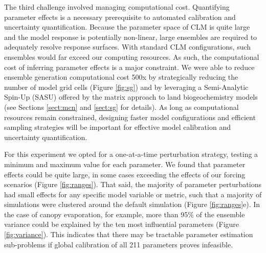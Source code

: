 \documentclass[draft]{agujournal2019}
\begin{document}
The third challenge involved managing computational cost. Quantifying parameter effects is a necessary prerequisite to automated calibration and uncertainty quantification. Because the parameter space of CLM is quite large and the model response is potentially non-linear, large ensembles are required to adequately resolve response surfaces. With standard CLM configurations, such ensembles would far exceed our computing resources. As such, the computational cost of inferring parameter effects is a major constraint. We were able to reduce ensemble generation computational cost 500x by strategically reducing the number of model grid cells (Figure \ref{fig:sg}) and by leveraging a Semi-Analytic Spin-Up (SASU) offered by the matrix approach to land biogeochemistry models \cite{lu2020,luo2022,liao2023} (see Sections \ref{sect:mcn} and \ref{sect:sg} for details). As long as computational resources remain constrained, designing faster model configurations and efficient sampling strategies will be important for effective model calibration and uncertainty quantification. 

For this experiment we opted for a one-at-a-time perturbation strategy, testing a minimum and maximum value for each parameter. We found that parameter effects could be quite large, in some cases exceeding the effects of our forcing scenarios (Figure \ref{fig:ranges}). That said, the majority of parameter perturbations had small effects for any specific model variable or metric, such that a majority of simulations were clustered around the default simulation (Figure \ref{fig:ranges}e). In the case of canopy evaporation, for example, more than 95\% of the ensemble variance could be explained by the ten most influential parameters (Figure \ref{fig:variance}). This indicates that there may be tractable parameter estimation sub-problems if global calibration of all 211 parameters proves infeasible. 
\end{document}
